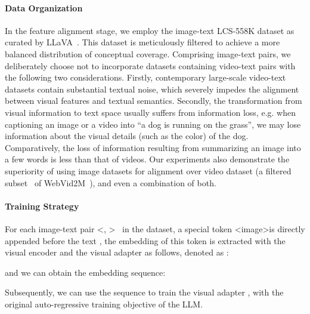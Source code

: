 \documentclass[10pt,twocolumn,letterpaper]{article}
\begin{document}
\paragraph{Data Organization} In the feature alignment stage, we employ the image-text LCS-558K dataset as curated by LLaVA~\cite{liu2023llava}. This dataset is meticulously filtered to achieve a more balanced distribution of conceptual coverage. Comprising image-text pairs, we deliberately choose not to incorporate datasets containing video-text pairs with the following two considerations. Firstly, contemporary large-scale video-text datasets contain substantial textual noise, which severely impedes the alignment between visual features and textual semantics. Secondly, the transformation from visual information to text space usually suffers from information loss, e.g. when captioning an image or a video into ``a dog is running on the grass'', we may lose information about the visual details (such as the color) of the dog. Comparatively, the loss of information resulting from summarizing an image into a few words is less than that of videos. Our experiments also demonstrate the superiority of using image datasets for alignment over video dataset (a filtered subset~\cite{luo2023valley} of WebVid2M~\cite{bain2021webvid}), and even a combination of both.

\paragraph{Training Strategy} For each image-text pair \textless , \textgreater~ in the dataset, a special token \textless image\textgreater is directly appended before the text , the embedding of this token is extracted with the visual encoder and the visual adapter as follows, denoted as :

and we can obtain the embedding sequence:

Subsequently, we can use the sequence to train the visual adapter , with the original auto-regressive training objective of the LLM.
\end{document}
